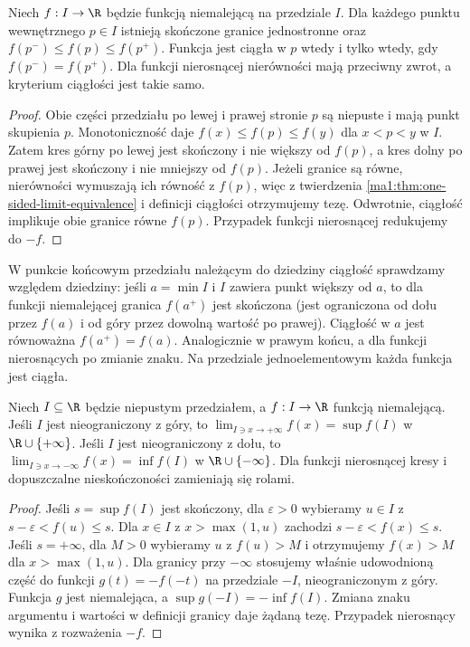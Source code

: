 \begin{wniosek}
\label{ma1:cor:monotone-interior-limits}
Niech $f:I\to\R$ będzie funkcją niemalejącą na przedziale $I$. Dla każdego punktu wewnętrznego $p\in I$ istnieją skończone granice jednostronne oraz
$f(p^-)\le f(p)\le f(p^+)$. Funkcja jest ciągła w $p$ wtedy i tylko wtedy, gdy $f(p^-)=f(p^+)$. Dla funkcji nierosnącej nierówności mają przeciwny zwrot, a kryterium ciągłości jest takie samo.
\end{wniosek}
\begin{proof}
Obie części przedziału po lewej i prawej stronie $p$ są niepuste i mają punkt skupienia $p$. Monotoniczność daje $f(x)\le f(p)\le f(y)$ dla $x<p<y$ w $I$. Zatem kres górny po lewej jest skończony i nie większy od $f(p)$, a kres dolny po prawej jest skończony i nie mniejszy od $f(p)$. Jeżeli granice są równe, nierówności wymuszają ich równość z $f(p)$, więc z twierdzenia \ref{ma1:thm:one-sided-limit-equivalence} i definicji ciągłości otrzymujemy tezę. Odwrotnie, ciągłość implikuje obie granice równe $f(p)$. Przypadek funkcji nierosnącej redukujemy do $-f$.
\end{proof}
W punkcie końcowym przedziału należącym do dziedziny ciągłość sprawdzamy względem dziedziny: jeśli $a=\min I$ i $I$ zawiera punkt większy od $a$, to dla funkcji niemalejącej granica $f(a^+)$ jest skończona (jest ograniczona od dołu przez $f(a)$ i od góry przez dowolną wartość po prawej). Ciągłość w $a$ jest równoważna $f(a^+)=f(a)$. Analogicznie w prawym końcu, a dla funkcji nierosnących po zmianie znaku. Na przedziale jednoelementowym każda funkcja jest ciągła.

\begin{twierdzenie}
\label{ma1:thm:monotone-at-infinity}
Niech $I\subseteq\R$ będzie niepustym przedziałem, a $f:I\to\R$ funkcją niemalejącą. Jeśli $I$ jest nieograniczony z góry, to $\lim_{I\ni x\to+\infty}f(x)=\sup f(I)$ w $\R\cup\{+\infty\}$. Jeśli $I$ jest nieograniczony z dołu, to $\lim_{I\ni x\to-\infty}f(x)=\inf f(I)$ w $\R\cup\{-\infty\}$. Dla funkcji nierosnącej kresy i dopuszczalne nieskończoności zamieniają się rolami.
\end{twierdzenie}
\begin{proof}
Jeśli $s=\sup f(I)$ jest skończony, dla $\varepsilon>0$ wybieramy $u\in I$ z $s-\varepsilon<f(u)\le s$. Dla $x\in I$ z $x>\max(1,u)$ zachodzi $s-\varepsilon<f(x)\le s$. Jeśli $s=+\infty$, dla $M>0$ wybieramy $u$ z $f(u)>M$ i otrzymujemy $f(x)>M$ dla $x>\max(1,u)$. Dla granicy przy $-\infty$ stosujemy właśnie udowodnioną część do funkcji $g(t)=-f(-t)$ na przedziale $-I$, nieograniczonym z góry. Funkcja $g$ jest niemalejąca, a $\sup g(-I)=-\inf f(I)$. Zmiana znaku argumentu i wartości w definicji granicy daje żądaną tezę. Przypadek nierosnący wynika z rozważenia $-f$.
\end{proof}

